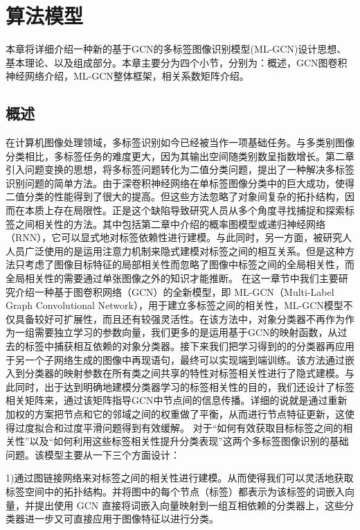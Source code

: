 \chapter{算法模型}

本章将详细介绍一种新的基于GCN的多标签图像识别模型(ML-GCN)设计思想、基本理论、以及组成部分。本章主要分为四个小节，分别为：概述，GCN图卷积神经网络介绍，ML-GCN整体框架，相关系数矩阵介绍。

\section{概述}

在计算机图像处理领域，多标签识别如今已经被当作一项基础任务。与多类别图像分类相比，多标签任务的难度更大，因为其输出空间随类别数呈指数增长。第二章引入问题变换的思想，将多标签问题转化为二值分类问题，提出了一种解决多标签识别问题的简单方法。由于深卷积神经网络在单标签图像分类中的巨大成功，使得二值分类的性能得到了很大的提高。但这些方法忽略了对象间复杂的拓扑结构，因而在本质上存在局限性。正是这个缺陷导致研究人员从多个角度寻找捕捉和探索标签之间相关性的方法。其中包括第二章中介绍的概率图模型或递归神经网络（RNN），它可以显式地对标签依赖性进行建模。与此同时，另一方面，被研究人人员广泛使用的是运用注意力机制来隐式建模对标签之间的相互关系。但是这种方法只考虑了图像目标特征的局部相关性而忽略了图像中标签之间的全局相关性，而全局相关性的需要通过单张图像之外的知识才能推断。
在这一章节中我们主要研究介绍一种基于图卷积网络（GCN）的全新模型，即 ML-GCN（Multi-Label Graph Convolutional Network），用于建立多标签之间的相关性，ML-GCN模型不仅具备较好可扩展性，而且还有较强灵活性。在该方法中，对象分类器不再作为作为一组需要独立学习的参数向量，我们更多的是运用基于GCN的映射函数，从过去的标签中捕获相互依赖的对象分类器。接下来我们把学习得到的的分类器再应用于另一个子网络生成的图像中再现语句，最终可以实现端到端训练。该方法通过嵌入到分类器的映射参数在所有类之间共享的特性对标签相关性进行了隐式建模。与此同时，出于达到明确地建模分类器学习的标签相关性的目的，我们还设计了标签相关矩阵来，通过该矩阵指导GCN中节点间的信息传播。详细的说就是通过重新加权的方案把节点和它的邻域之间的权重做了平衡，从而进行节点特征更新，这使得过度拟合和过度平滑问题得到有效缓解。
对于“如何有效获取目标标签之间的相关性”以及“如何利用这些标签相关性提升分类表现”这两个多标签图像识别的基础问题。该模型主要从一下三个方面设计：

1)通过图链接网络来对标签之间的相关性进行建模。从而使得我们可以灵活地获取标签空间中的拓扑结构。并将图中的每个节点（标签）都表示为该标签的词嵌入向量，并提出使用 GCN 直接将词嵌入向量映射到一组互相依赖的分类器上，这些分类器进一步又可直接应用于图像特征以进行分类。

